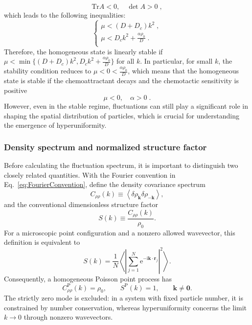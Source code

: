 \documentclass{article}
\begin{document}
\begin{equation}
    \mathrm{Tr}A<0, \quad \det A>0\;,
\end{equation}
which leads to the following inequalities:
\begin{equation}
    \begin{cases}
        \mu <(D+D_c)k^2\;,\\
        \mu <D_ck^2+\frac{\alpha \rho _0}{D}\;.\\
    \end{cases}
\end{equation}
Therefore, the homogeneous state is linearly stable if $\mu < \min\{(D+D_c)k^2, D_ck^2 + \frac{\alpha \rho_0}{D}\}$ for all $k$. In particular, for small $k$, the stability condition reduces to $\mu < 0 < \frac{\alpha \rho_0}{D}$, which means that the homogeneous state is stable if the chemoattractant decays and the chemotactic sensitivity is positive 
\begin{equation}
    \mu < 0, \quad \alpha > 0\;.
    \label{eq:stabilityCondition}
\end{equation}
However, even in the stable regime, fluctuations can still play a significant role in shaping the spatial distribution of particles, which is crucial for understanding the emergence of hyperuniformity.

\subsubsection{Density spectrum and normalized structure factor}

Before calculating the fluctuation spectrum, it is important to distinguish two closely related quantities. With the Fourier convention in Eq.~\eqref{eq:FourierConvention}, define the density covariance spectrum
\begin{equation}
    C_{\rho\rho}(k)\equiv
    \left\langle\delta\rho_{\mathbf k}\delta\rho_{-\mathbf k}\right\rangle,
    \label{eq:densityCovarianceSpectrum}
\end{equation}
and the conventional dimensionless structure factor
\begin{equation}
    S(k)\equiv\frac{C_{\rho\rho}(k)}{\rho_0}.
    \label{eq:normalizedStructureFactor}
\end{equation}
For a microscopic point configuration and a nonzero allowed wavevector, this definition is equivalent to
\begin{equation}
    S(k)=\frac{1}{N}\left\langle
    \left|\sum_{j=1}^{N}\mathrm{e}^{-\mathrm{i}\mathbf k\cdot\mathbf r_j}\right|^2
    \right\rangle.
\end{equation}
Consequently, a homogeneous Poisson point process has
\begin{equation}
    C_{\rho\rho}^{\mathrm P}(k)=\rho_0,
    \qquad S^{\mathrm P}(k)=1,
    \qquad \mathbf k\neq\mathbf 0.
\end{equation}
The strictly zero mode is excluded: in a system with fixed particle number, it is constrained by number conservation, whereas hyperuniformity concerns the limit $k\to0$ through nonzero wavevectors.
\end{document}
